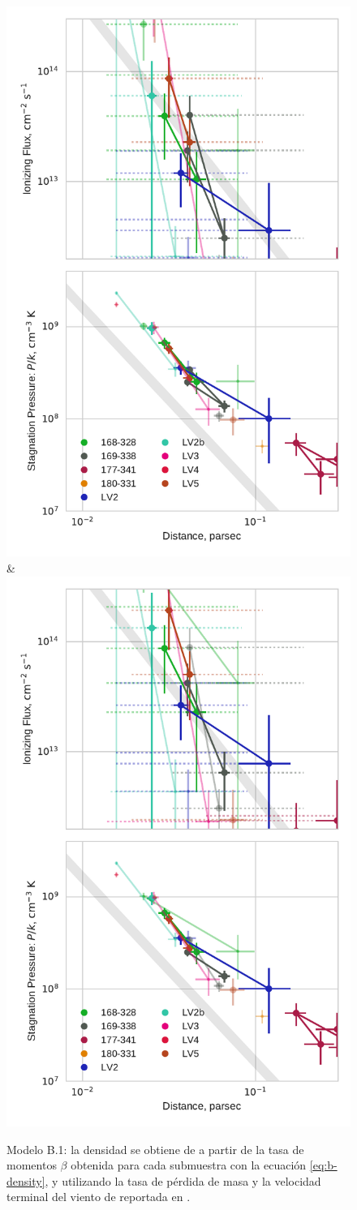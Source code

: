 \begin{figure}
  \ContinuedFloat
  \captionsetup{list=off, format=cont}
  \includegraphics[width=0.5\linewidth]{./Figures/plot-wind-fits-beta}& \includegraphics[width=0.5\linewidth]{./Figures/plot-wind-fits-beta-2}
  \caption{Modelo B.1: la densidad se obtiene de a partir de la tasa de momentos $\beta$ obtenida para cada submuestra con la ecuación \ref{eq:b-density}, y utilizando la tasa de pérdida de masa y la velocidad terminal del viento de \thC{} reportada en \citet{GAH:2002}.}
\end{figure}

